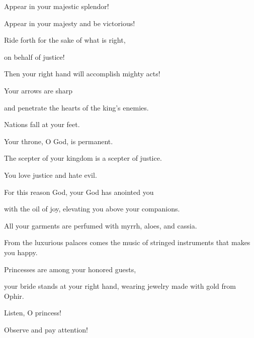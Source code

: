 {\par }{\Q Appear in your majestic
splendor!
\par }{\Q {}Appear in your majesty
and be victorious!

\par }{\Q Ride
forth for the sake of what is right,

\par }{\Q on behalf
of justice!

\par }{\Q Then your right hand
will accomplish
mighty acts!
\par }{\Q {}Your arrows
are sharp
\par }{\Q and penetrate
the hearts
of the king’s
enemies.
\par }{\Q Nations
fall at your feet.
\par }{\Q {}Your throne,
O God,
is permanent.
\par }{\Q The scepter
of your kingdom
is a scepter
of justice.
\par }{\Q {}You love
justice
and hate
evil.
\par }{\Q For this reason
God,
your God
has anointed
you

\par }{\Q with the oil
of joy,
elevating
you above
your companions.
\par }{\Q {}All
your garments
are perfumed with myrrh,
aloes,
and cassia.
\par }{\Q From
the luxurious palaces
comes the music of stringed
instruments that makes you happy.
\par }{\Q {}Princesses
are among your honored
guests,
\par }{\Q your bride stands
at your right hand,
wearing jewelry made with gold
from Ophir.
\par }{\Q {}Listen,
O princess!

\par }{\Q Observe
and pay attention!

}

